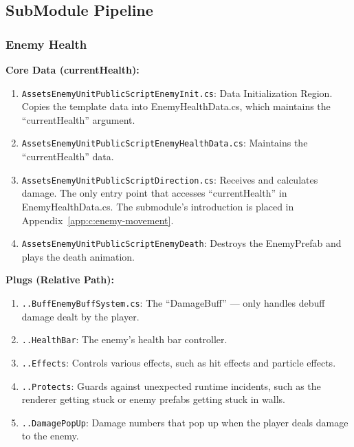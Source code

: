 \subsection{SubModule Pipeline}\label{sec:pipeline}

\subsubsection{Enemy Health}

\par \hspace{1.5em} \textbf{Core Data (currentHealth):}

\begin{enumerate}
	\item \texttt{\bs Assets\bs EnemyUnit\bs PublicScript\bs EnemyInit.cs}: Data Initialization Region. Copies the template data into EnemyHealthData.cs, which maintains the ``currentHealth'' argument.
	\item \texttt{\bs Assets\bs EnemyUnit\bs PublicScript\bs EnemyHealthData.cs}: Maintains the ``currentHealth'' data.
	\item \texttt{\bs Assets\bs EnemyUnit\bs PublicScript\bs Direction.cs}: Receives and calculates damage. The only entry point that accesses ``currentHealth'' in EnemyHealthData.cs. The submodule's introduction is placed in Appendix~\ref{app:c:enemy-movement}.
	\item \texttt{\bs Assets\bs EnemyUnit\bs PublicScript\bs EnemyDeath}: Destroys the EnemyPrefab and plays the death animation.
\end{enumerate}

\par\textbf{Plugs (Relative Path):}

\begin{enumerate}
	\item\texttt{\bs ..\bs Buff\bs EnemyBuffSystem.cs}: The ``DamageBuff'' — only handles debuff damage dealt by the player.
	\item\texttt{\bs ..\bs HealthBar}: The enemy's health bar controller.
	\item\texttt{\bs ..\bs Effects}: Controls various effects, such as hit effects and particle effects.
	\item\texttt{\bs ..\bs Protects}: Guards against unexpected runtime incidents, such as the renderer getting stuck or enemy prefabs getting stuck in walls.
	\item\texttt{\bs ..\bs DamagePopUp}: Damage numbers that pop up when the player deals damage to the enemy.
\end{enumerate}

